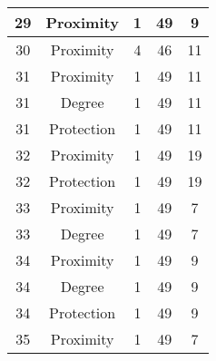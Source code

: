 \documentclass[results.tex]{subfiles}
\begin{document}
\begin{center}
\begin{tabular}{| c || c | c | c | c |}
            \hline
            29                      & Proximity                    & 1                      & 49                      & 9                    \\
            \hline
            30                      & Proximity                    & 4                      & 46                      & 11                   \\
            \hline
            31                      & Proximity                    & 1                      & 49                      & 11                   \\
            \hline
            31                      & Degree                       & 1                      & 49                      & 11                   \\
            \hline
            31                      & Protection                   & 1                      & 49                      & 11                   \\
            \hline
            32                      & Proximity                    & 1                      & 49                      & 19                   \\
            \hline
            32                      & Protection                   & 1                      & 49                      & 19                   \\
            \hline
            33                      & Proximity                    & 1                      & 49                      & 7                    \\
            \hline
            33                      & Degree                       & 1                      & 49                      & 7                    \\
            \hline
            34                      & Proximity                    & 1                      & 49                      & 9                    \\
            \hline
            34                      & Degree                       & 1                      & 49                      & 9                    \\
            \hline
            34                      & Protection                   & 1                      & 49                      & 9                    \\
            \hline
            35                      & Proximity                    & 1                      & 49                      & 7                    \\

\end{tabular}
\end{center}
\end{document}
